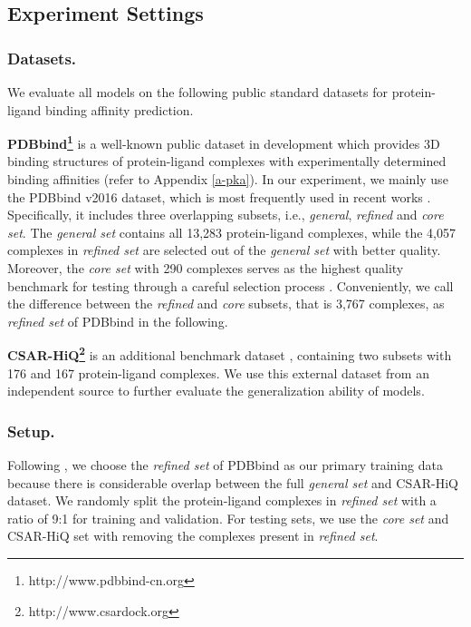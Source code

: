 \documentclass[sigconf]{acmart}
\newcommand{\B}[1]{{\bfseries #1}}
\begin{document}
\setlength{\skip\footins}{3mm}
\subsection{Experiment Settings}
\subsubsection{Datasets.}
We evaluate all models on the following public standard datasets for protein-ligand binding affinity prediction.




\B{PDBbind\footnote{http://www.pdbbind-cn.org}} is a well-known public dataset \cite{wang2005pdbbind} in development which provides 3D binding structures of protein-ligand complexes with experimentally determined binding affinities (refer to Appendix \ref{a-pka}). In our experiment, we mainly use the PDBbind v2016 dataset, which is most frequently used in recent works \cite{stepniewska2018development,zheng2019onionnet}. Specifically, it includes three overlapping subsets, i.e., \textit{general}, \textit{refined} and \textit{core set}. The \textit{general set} contains all 13,283 protein-ligand complexes, while the 4,057 complexes in \textit{refined set} are selected out of the \textit{general set} with better quality. Moreover, the \textit{core set} with 290 complexes serves as the highest quality benchmark for testing through a careful selection process \cite{su2018comparative}. Conveniently, we call the difference between the \textit{refined} and \textit{core} subsets, that is 3,767 complexes, as \textit{refined set} of PDBbind in the following.
    
\B{CSAR-HiQ\footnote{http://www.csardock.org}} is an additional benchmark dataset \cite{dunbar2011csar}, containing two subsets with 176 and 167 protein-ligand complexes. We use this external dataset from an independent source to further evaluate the generalization ability of models.
    
\subsubsection{Setup.}
\label{exp-setup}
Following \cite{ballester2010machine}, we choose the \textit{refined set} of PDBbind as our primary training data because there is considerable overlap between the full \textit{general set} and CSAR-HiQ dataset. We randomly split the protein-ligand complexes in \textit{refined set} with a ratio of 9:1 for training and validation. For testing sets, we use the \textit{core set} and CSAR-HiQ set with removing the complexes present in \textit{refined set}.
\end{document}
